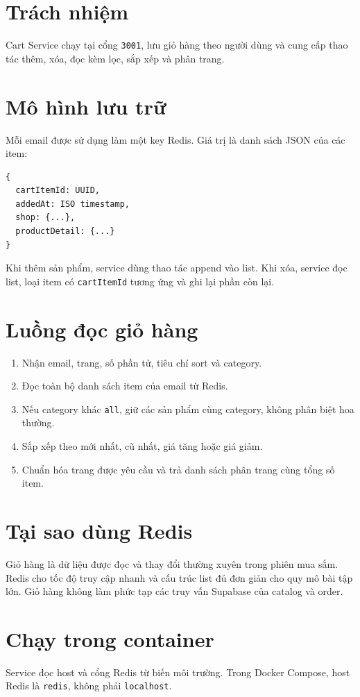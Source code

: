 \documentclass[12pt]{article}
\begin{document}

\section{Trách nhiệm}
Cart Service chạy tại cổng \texttt{3001}, lưu giỏ hàng theo người dùng và cung cấp thao tác thêm, xóa, đọc kèm lọc, sắp xếp và phân trang.

\section{Mô hình lưu trữ}
Mỗi email được sử dụng làm một key Redis. Giá trị là danh sách JSON của các item:
\begin{verbatim}
{
  cartItemId: UUID,
  addedAt: ISO timestamp,
  shop: {...},
  productDetail: {...}
}
\end{verbatim}
Khi thêm sản phẩm, service dùng thao tác append vào list. Khi xóa, service đọc list, loại item có \texttt{cartItemId} tương ứng và ghi lại phần còn lại.

\section{Luồng đọc giỏ hàng}
\begin{enumerate}
  \item Nhận email, trang, số phần tử, tiêu chí sort và category.
  \item Đọc toàn bộ danh sách item của email từ Redis.
  \item Nếu category khác \texttt{all}, giữ các sản phẩm cùng category, không phân biệt hoa thường.
  \item Sắp xếp theo mới nhất, cũ nhất, giá tăng hoặc giá giảm.
  \item Chuẩn hóa trang được yêu cầu và trả danh sách phân trang cùng tổng số item.
\end{enumerate}

\section{Tại sao dùng Redis}
Giỏ hàng là dữ liệu được đọc và thay đổi thường xuyên trong phiên mua sắm. Redis cho tốc độ truy cập nhanh và cấu trúc list đủ đơn giản cho quy mô bài tập lớn. Giỏ hàng không làm phức tạp các truy vấn Supabase của catalog và order.

\section{Chạy trong container}
Service đọc host và cổng Redis từ biến môi trường. Trong Docker Compose, host Redis là \texttt{redis}, không phải \texttt{localhost}.

\end{document}
